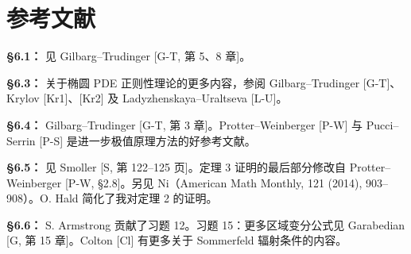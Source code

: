 \documentclass[../../main.tex]{subfiles}
\begin{document}
\section{参考文献}\label{section:ch06-参考文献}

\textbf{\S 6.1：} 见 Gilbarg--Trudinger [G-T, 第 5、8 章]。

\textbf{\S 6.3：} 关于椭圆 PDE 正则性理论的更多内容，参阅 Gilbarg--Trudinger [G-T]、Krylov [Kr1]、[Kr2] 及 Ladyzhenskaya--Uraltseva [L-U]。

\textbf{\S 6.4：} Gilbarg--Trudinger [G-T, 第 3 章]。Protter--Weinberger [P-W] 与 Pucci--Serrin [P-S] 是进一步极值原理方法的好参考文献。

\textbf{\S 6.5：} 见 Smoller [S, 第 122--125 页]。定理 3 证明的最后部分修改自 Protter--Weinberger [P-W, \S 2.8]。另见 Ni（American Math Monthly, 121 (2014), 903--908）。O. Hald 简化了我对定理 2 的证明。

\textbf{\S 6.6：} S. Armstrong 贡献了习题 12。习题 15：更多区域变分公式见 Garabedian [G, 第 15 章]。Colton [Cl] 有更多关于 Sommerfeld 辐射条件的内容。
\end{document}
